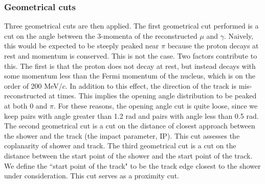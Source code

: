 \documentclass[a4paper, 10pt]{article}
\begin{document}


\subsubsection{Geometrical cuts}
Three geometrical cuts are then applied.  
The first geometrical cut performed is a cut on the angle between the 3-momenta of the reconstructed $\mu$ and $\gamma$. Naively, this would be expected to be steeply peaked near $\pi$ because the proton decays at rest and momentum is conserved. This is not the case. Two factors contribute to this. The first is that the proton does not decay at rest, but instead decays with some momentum less than the Fermi momentum of the nucleus, which is on the order of 200 MeV/$c$.  In addition to this effect, the direction of the track is mis-reconstructed at times. This implies the opening angle distribution to be peaked at both 0 and $\pi$. For these reasons, the opening angle cut is quite loose, since we keep pairs with angle greater than 1.2 rad and pairs with angle less than 0.5 rad.\\
The second geometrical cut is a cut on the distance of closest approach between the shower and the track (the impact parameter, IP). This cut assesses the coplanarity of shower and track. The third geometrical cut is a cut on the distance between the start point of the shower and the start point of the track. We define the ``start point of the track" to be the track edge closest to the shower under consideration. This cut serves as a proximity cut. 
\end{document}
